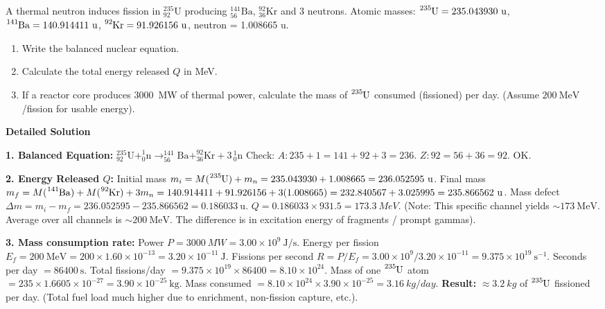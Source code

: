 \documentclass[11pt]{article}
\begin{document}
\begin{exoresolu}
A thermal neutron induces fission in $\ensuremath{\mathrm{^{235}_{92}U}}$ producing $\ensuremath{\mathrm{^{141}_{56}Ba}}$, $\ensuremath{\mathrm{^{92}_{36}Kr}}$ and 3 neutrons.
Atomic masses: $\ce{^{235}U} = 235.043930\ \text{u}$, $\ce{^{141}Ba} = 140.914411\ \text{u}$, $\ce{^{92}Kr} = 91.926156\ \text{u}$, neutron = 1.008665 u.
\begin{enumerate}
\item Write the balanced nuclear equation.
\item Calculate the total energy released $Q$ in MeV.
\item If a reactor core produces \SI{3000}{MW} of thermal power, calculate the mass of $\ce{^{235}U}$ consumed (fissioned) per day. (Assume $200\ \text{MeV}$/fission for usable energy).
\end{enumerate}
\tcblower
\textbf{Detailed Solution}

\textbf{1. Balanced Equation:}
$\ensuremath{\mathrm{^{235}_{92}U + ^{1}_{0}n \rightarrow  ^{141}_{56}Ba + ^{92}_{36}Kr + 3\,^{1}_{0}n}}$
Check: $A: 235+1 = 141+92+3 = 236$. $Z: 92 = 56+36 = 92$. OK.

\textbf{2. Energy Released $Q$:}
Initial mass $m_i = M(\ce{^{235}U}) + m_n = 235.043930 + 1.008665 = 236.052595\ \text{u}$.
Final mass $m_f = M(\ce{^{141}Ba}) + M(\ce{^{92}Kr}) + 3 m_n = 140.914411 + 91.926156 + 3(1.008665) = 232.840567 + 3.025995 = 235.866562\ \text{u}$.
Mass defect $\Delta m = m_i - m_f = 236.052595 - 235.866562 = 0.186033\ \text{u}$.
$Q = 0.186033 \times 931.5 = \SI{173.3}{MeV}$.
(Note: This specific channel yields $\sim 173\ \text{MeV}$. Average over all channels is $\sim 200\ \text{MeV}$. The difference is in excitation energy of fragments / prompt gammas).

\textbf{3. Mass consumption rate:}
Power $P = \SI{3000}{MW} = 3.00 \times 10^9\ \text{J/s}$.
Energy per fission $E_f = 200\ \text{MeV} = 200 \times 1.60 \times 10^{-13} = 3.20 \times 10^{-11}\ \text{J}$.
Fissions per second $R = P / E_f = 3.00 \times 10^9 / 3.20 \times 10^{-11} = 9.375 \times 10^{19}\ \text{s}^{-1}$.
Seconds per day $= 86400\ \text{s}$.
Total fissions/day $= 9.375 \times 10^{19} \times 86400 = 8.10 \times 10^{24}$.
Mass of one $\ce{^{235}U}$ atom $= 235 \times 1.6605 \times 10^{-27} = 3.90 \times 10^{-25}\ \text{kg}$.
Mass consumed $= 8.10 \times 10^{24} \times 3.90 \times 10^{-25} = \SI{3.16}{kg/day}$.
\textbf{Result:} $\approx \SI{3.2}{kg}$ of $\ce{^{235}U}$ fissioned per day. (Total fuel load much higher due to enrichment, non-fission capture, etc.).
\end{exoresolu}
\end{document}
